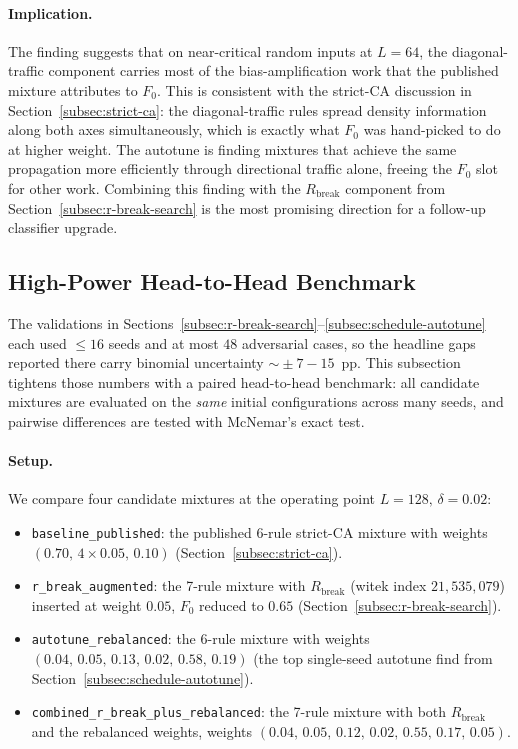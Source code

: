 \documentclass[11pt,a4paper]{article}
\begin{document}
\paragraph{Implication.}
The finding suggests that on near-critical random inputs at \(L=64\),
the diagonal-traffic component carries most of the bias-amplification
work that the published mixture attributes to \(F_0\).  This is
consistent with the strict-CA discussion in
Section~\ref{subsec:strict-ca}: the diagonal-traffic rules spread
density information along both axes simultaneously, which is exactly
what \(F_0\) was hand-picked to do at higher weight.  The autotune is
finding mixtures that achieve the same propagation more efficiently
through directional traffic alone, freeing the \(F_0\) slot for other
work.  Combining this finding with the \(R_{\mathrm{break}}\)
component from Section~\ref{subsec:r-break-search} is the most
promising direction for a follow-up classifier upgrade.

\subsection{High-Power Head-to-Head Benchmark}
\label{subsec:h2h-benchmark}

The validations in
Sections~\ref{subsec:r-break-search}--\ref{subsec:schedule-autotune}
each used \(\leq 16\) seeds and at most \(48\) adversarial cases, so
the headline gaps reported there carry binomial uncertainty
\({\sim}\!\pm 7{-}15\)~pp.  This subsection tightens those numbers
with a paired head-to-head benchmark: all candidate mixtures are
evaluated on the \emph{same} initial configurations across many seeds,
and pairwise differences are tested with McNemar's exact test.

\paragraph{Setup.}
We compare four candidate mixtures at the operating point
\(L = 128,\,\delta = 0.02\):
{\sloppy
\begin{itemize}
\item \texttt{baseline\_published}: the published 6-rule strict-CA
  mixture with weights \((0.70,\,4{\times}0.05,\,0.10)\)
  (Section~\ref{subsec:strict-ca}).
\item \texttt{r\_break\_augmented}: the 7-rule mixture with
  \(R_{\mathrm{break}}\) (witek index \(21{,}535{,}079\)) inserted at
  weight \(0.05\), \(F_0\) reduced to \(0.65\)
  (Section~\ref{subsec:r-break-search}).
\item \texttt{autotune\_rebalanced}: the 6-rule mixture with weights
  \((0.04,\,0.05,\,0.13,\,0.02,\,0.58,\,0.19)\) (the top single-seed
  autotune find from Section~\ref{subsec:schedule-autotune}).
\item \texttt{combined\_r\_break\_plus\_rebalanced}: the 7-rule
  mixture with both \(R_{\mathrm{break}}\) and the rebalanced
  weights, weights \((0.04,\,0.05,\,0.12,\,0.02,\,0.55,\,0.17,\,0.05)\).
\end{itemize}
\par}
\end{document}
